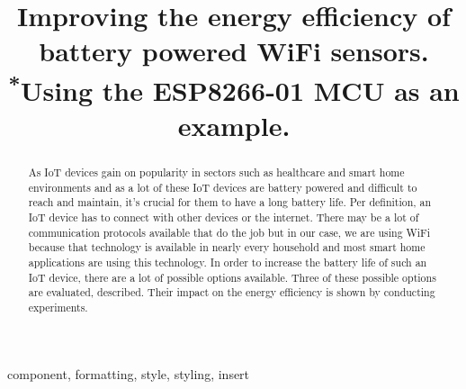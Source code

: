 \documentclass[conference]{IEEEtran}
\begin{document}
\title{Improving the energy efficiency of battery powered WiFi sensors.\\
{\footnotesize \textsuperscript{*}Using the ESP8266-01 MCU as an example.}
}

\author{
\and
{}
\and
{}
}

\maketitle

\begin{abstract}
As IoT devices gain on popularity in sectors such as healthcare and smart home environments and as a lot of these IoT devices are battery powered and difficult to reach and maintain, it's crucial for them to have a long battery life.
Per definition, an IoT device has to connect with other devices or the internet. 
There may be a lot of communication protocols available that do the job but in our case, we are using WiFi because that technology is available in nearly every household and most smart home applications are using this technology.
In order to increase the battery life of such an IoT device, there are a lot of possible options available.
Three of these possible options are evaluated, described. Their impact on the energy efficiency is shown by conducting experiments.


\end{abstract}

\begin{IEEEkeywords}
component, formatting, style, styling, insert
\end{IEEEkeywords}
\end{document}

